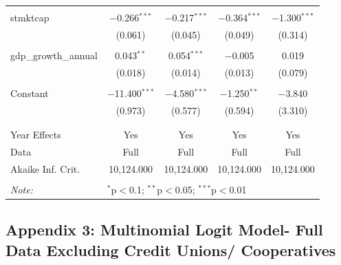 \documentclass[a4paper, nobind]{templates/ociamthesis}
\begin{document}
\begin{table}[!htbp]
\begin{tabular}{@{\extracolsep{5pt}}lcccc}
  & & & & \\ 
 stmktcap & $-$0.266$^{***}$ & $-$0.217$^{***}$ & $-$0.364$^{***}$ & $-$1.300$^{***}$ \\ 
  & (0.061) & (0.045) & (0.049) & (0.314) \\ 
  & & & & \\ 
 gdp\_growth\_annual & 0.043$^{**}$ & 0.054$^{***}$ & $-$0.005 & 0.019 \\ 
  & (0.018) & (0.014) & (0.013) & (0.079) \\ 
  & & & & \\ 
 Constant & $-$11.400$^{***}$ & $-$4.580$^{***}$ & $-$1.250$^{**}$ & $-$3.840 \\ 
  & (0.973) & (0.577) & (0.594) & (3.310) \\ 
  & & & & \\ 
\hline \\[-1.8ex] 
Year Effects & Yes & Yes & Yes & Yes \\ 
Data & Full & Full & Full & Full \\ 
Akaike Inf. Crit. & 10,124.000 & 10,124.000 & 10,124.000 & 10,124.000 \\ 
\hline 
\hline \\[-1.8ex] 
\textit{Note:}  & \multicolumn{4}{l}{$^{*}$p$<$0.1; $^{**}$p$<$0.05; $^{***}$p$<$0.01} \\ 
\end{tabular} 
\end{table}

\newpage

\hypertarget{appendix-3-multinomial-logit-model--full-data-excluding-credit-unions-cooperatives}{%
\subsection{Appendix 3: Multinomial Logit Model- Full Data Excluding Credit Unions/ Cooperatives}\label{appendix-3-multinomial-logit-model--full-data-excluding-credit-unions-cooperatives}}
\end{document}
